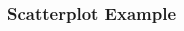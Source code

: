 \documentclass{beamer}
\begin{document}
\begin{frame}
\frametitle{Scatterplot Example}
	\begin{columns}

	\begin{column}{0.45\textwidth}
	 \begin{center}
		 \end{center}
	\end{column}

	\begin{column}{0.55\textwidth}
		 \begin{center}
		 \end{center}
	\end{column}
\end{columns}
\end{frame}
\end{document}
